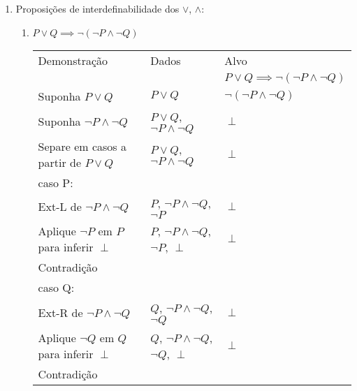 \documentclass[a4paper, 12pt]{article}
\begin{document}
\begin{enumerate}
    \newpage
    \item Proposições de interdefinabilidade dos $\lor$, $\land$:
    \begin{enumerate}[1.]
        \item $P \lor Q \implies \neg (\neg P \land \neg Q)$
        \begin{table}[h!]
            \centering
            \begin{tabular}{|p{4cm} | p{4cm} | p{4cm} |}
            \rowcolor{gray!50}
            Demonstração & Dados & Alvo \\
            && $P \lor Q \implies \neg (\neg P \land \neg Q)$\\
            Suponha $P \lor Q$ &$P \lor Q$& $\neg (\neg P \land \neg Q)$ \\
            Suponha $\neg P \land \neg Q$ & $P \lor Q$, $\neg P \land \neg Q$ & $\perp$\\
            Separe em casos a partir de $P \lor Q$ & $P \lor Q$, $\neg P \land \neg Q$ & $\perp$\\
            \hline
            caso P: & &\\
            Ext-L de $\neg P \land \neg Q$ & $P$, $\neg P \land \neg Q$, $\neg P$ & $\perp$\\
            Aplique $\neg P$ em $P$ para inferir $\perp$ & $P$, $\neg P \land \neg Q$, $\neg P$, $\perp$ & $\perp$\\
            Contradição&&\\
            \hline
            caso Q:&&\\
            Ext-R de $\neg P \land \neg Q$ & $Q$, $\neg P \land \neg Q$, $\neg Q$ & $\perp$\\
            Aplique $\neg Q$ em $Q$ para inferir $\perp$ & $Q$, $\neg P \land \neg Q$, $\neg Q$, $\perp$ & $\perp$\\
            Contradição&&\\
            \hline
            \end{tabular}
        \end{table}


\end{enumerate}
\end{enumerate}
\end{document}

